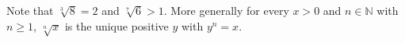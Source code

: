 Note that $\sqrt[3]{8} = 2$ and $\sqrt[7]{6} > 1$.
More generally for every $x > 0$ and $n \in \mathbb{N}$ with $n \geq 1$, $\sqrt[n]{x}$ is the unique positive $y$ with $y^{n} = x$.